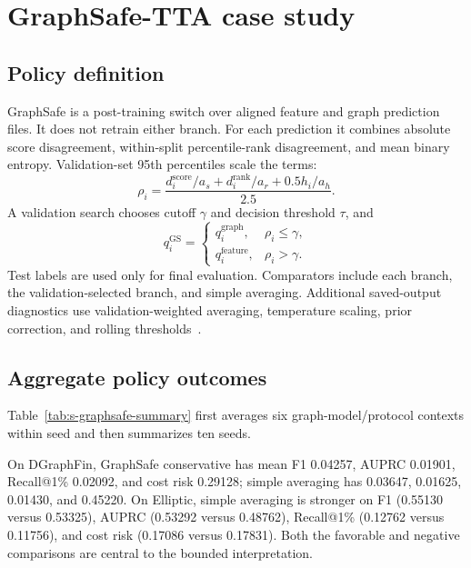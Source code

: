 \section{GraphSafe-TTA case study}
\label{sec:s-graphsafe-v2}

\subsection{Policy definition}

GraphSafe is a post-training switch over aligned feature and graph prediction files. It does not retrain either branch. For each prediction it combines absolute score disagreement, within-split percentile-rank disagreement, and mean binary entropy. Validation-set 95th percentiles scale the terms:
\begin{equation}
 \rho_i=\frac{d_i^{\mathrm{score}}/a_s+d_i^{\mathrm{rank}}/a_r+
 0.5h_i/a_h}{2.5}.
\end{equation}
A validation search chooses cutoff \(\gamma\) and decision threshold \(\tau\), and
\begin{equation}
 q_i^{\mathrm{GS}}=
 \begin{cases}
 q_i^{\mathrm{graph}}, & \rho_i\leq\gamma,\\
 q_i^{\mathrm{feature}}, & \rho_i>\gamma.
 \end{cases}
\end{equation}
Test labels are used only for final evaluation. Comparators include each branch, the validation-selected branch, and simple averaging. Additional saved-output diagnostics use validation-weighted averaging, temperature scaling, prior correction, and rolling thresholds~\cite{guo2017calibration,saerens2002prior,geifman2017selective}.

\subsection{Aggregate policy outcomes}

Table~\ref{tab:s-graphsafe-summary} first averages six graph-model/protocol contexts within seed and then summarizes ten seeds.



On DGraphFin, GraphSafe conservative has mean F1 0.04257, AUPRC 0.01901, Recall@1\% 0.02092, and cost risk 0.29128; simple averaging has 0.03647, 0.01625, 0.01430, and 0.45220. On Elliptic, simple averaging is stronger on F1 (0.55130 versus 0.53325), AUPRC (0.53292 versus 0.48762), Recall@1\% (0.12762 versus 0.11756), and cost risk (0.17086 versus 0.17831). Both the favorable and negative comparisons are central to the bounded interpretation.

